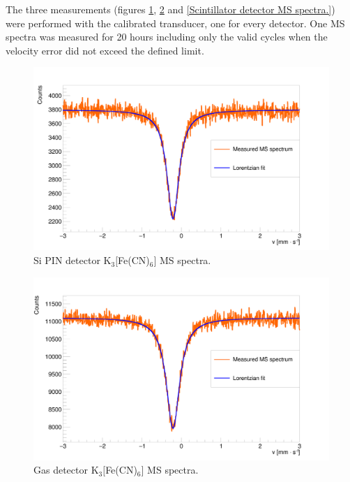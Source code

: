 \par
The three measurements (figures \ref{Si PIN detector MS spectra.}, \ref{Gas detector MS spectra.} and \ref{Scintillator detector MS spectra.}) were performed with the calibrated transducer, one for every detector. One MS spectra was measured for 20 hours including only the valid cycles when the velocity error did not exceed the defined limit.



\begin{figure}[H]
\centering
\includegraphics[scale=0.125, angle = 0]{./pictures/MossSemi.png}
\caption{Si PIN detector K$_{3}[$Fe(CN)$_{6}]$ MS spectra.}
\label{Si PIN detector MS spectra.}

\end{figure}

\begin{figure}[H]
\centering
\includegraphics[scale=0.125, angle = 0]{./pictures/MossGas.png}
\caption{Gas detector K$_{3}[$Fe(CN)$_{6}]$ MS spectra.}
\label{Gas detector MS spectra.}

\end{figure}

